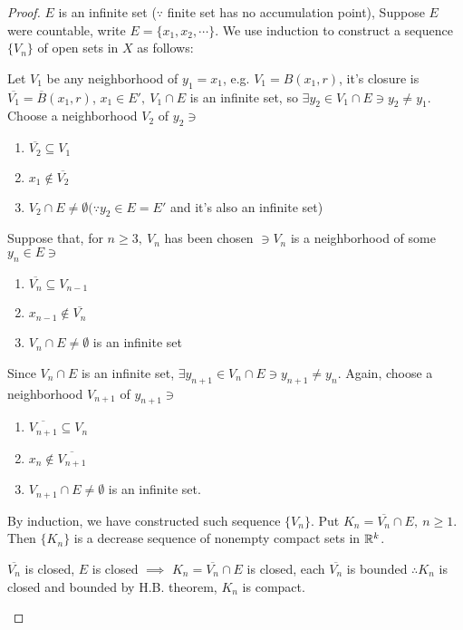 \begin{proof}
	$E$ is an infinite set ($\because$ finite set has no accumulation point), Suppose $E$ were countable, write $E = \{x_1,x_2,\cdots\}$. We use induction to construct a sequence $\{V_n\}$ of open sets in $X$ as follows:
	
	Let $V_1$ be any neighborhood of $y_1 = x_1$, e.g. $V_1 = B(x_1,r)$, it's closure is $\overline{V_1} = \overline{B}(x_1,r)$, $x_1 \in E',~V_1 \cap E$ is an infinite set, so $\exists y_2 \in V_1 \cap E \ni y_2 \neq y_1$. Choose a neighborhood $V_2$ of $y_2 \ni$
	\begin{enumerate}[wide,label=$(\roman*)$]
		\item $\overline{V_2} \subseteq V_1$
		\item $x_1 \notin \overline{V_2}$
		\item $V_2 \cap E \neq \emptyset (\because y_2 \in E = E'$ and it's also an infinite set)
	\end{enumerate}
	
	Suppose that, for $n \geq 3,~V_n$ has been chosen $\ni V_n$ is a neighborhood of some $y_n \in E \ni$
	
	\begin{enumerate}
		\item $\overline{V_n} \subseteq V_{n-1}$
		\item $x_{n-1} \notin \overline{V_n}$
		\item $V_n \cap E \neq \emptyset$ is an infinite set 
	\end{enumerate} 
	
	Since $V_n \cap E$ is an infinite set, $\exists y_{n+1} \in V_n \cap E \ni y_{n+1} \neq y_n$. Again, choose a neighborhood  $V_{n+1}$ of $y_{n+1} \ni$
	
	\begin{enumerate}
		\item $\overline{V_{n+1}} \subseteq V_n$
		\item $x_n \notin \overline{V_{n+1}}$
		\item $V_{n+1} \cap E \neq \emptyset$ is an infinite set.
	\end{enumerate}
	
	By induction, we have constructed such sequence $\{V_n\}$. Put $K_n = \overline{V_n} \cap E,~n \geq 1$. Then $\{K_n\}$ is a decrease sequence of nonempty compact sets in $\mathbb{R}^k$.
	
	\begin{tcolorbox}
		$\overline{V_n}$ is closed, $E$ is closed $\implies$ $K_n = \overline{V_n} \cap E$ is closed, each $\overline{V_n}$ is bounded $\therefore K_n$ is closed and bounded by H.B. theorem, $K_n$ is compact.
		

\end{tcolorbox}
\end{proof}
